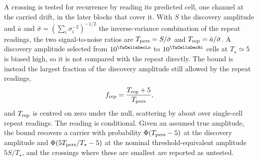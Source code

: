 A crossing is tested for recurrence by reading its predicted cell, one
channel at the carried drift, in the later blocks that cover it. With $S$
the discovery amplitude and $\bar{a}$ and $\bar{\sigma}=(\sum_i
\sigma_i^{-2})^{-1/2}$ the inverse-variance combination of the repeat
readings, the two signal-to-noise ratios are $T_{\rm pers}=S/\bar{\sigma}$
and $T_{\rm rep}=\bar{a}/\bar{\sigma}$. A discovery amplitude selected from
$10^{\TuCellsDecLo}$ to $10^{\TuCellsDecHi}$ cells at $T_\star\simeq5$ is
biased high, so it is not compared with the repeat directly. The bound is
instead the largest fraction of the discovery amplitude still allowed by the
repeat readings,
\begin{equation*}
f_{\rm rep}=\frac{T_{\rm rep}+5}{T_{\rm pers}},
\end{equation*}
and $T_{\rm rep}$ is centred on zero under the null, scattering by
\NuNullSd{} about \NuNullMean{} over \NuNullN{} single-cell repeat readings.
The reading is conditional. Given an assumed true amplitude, the bound
recovers a carrier with probability $\Phi(T_{\rm pers}-5)$ at the discovery
amplitude and $\Phi(5T_{\rm pers}/T_\star-5)$ at the nominal
threshold-equivalent amplitude $5S/T_\star$, and the \HjNPowerLo{} crossings
where these are smallest are reported as untested.
